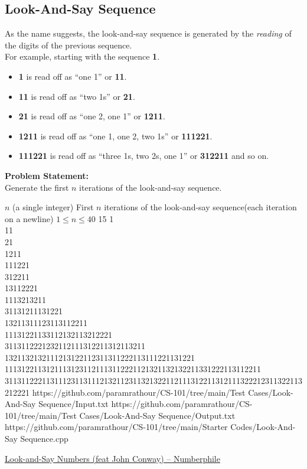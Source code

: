 \subsection{Look-And-Say Sequence}
As the name suggests, the look-and-say sequence is generated by the \emph{reading} of the digits of the previous sequence.\\%
For example, starting with the sequence \textbf{1}.
\begin{itemize}
\item \textbf{1} is read off as ``one 1'' or \textbf{11}.
\item \textbf{11} is read off as ``two 1s'' or \textbf{21}.
\item \textbf{21} is read off as ``one 2, one 1'' or \textbf{1211}.
\item \textbf{1211} is read off as ``one 1, one 2, two 1s'' or \textbf{111221}.
\item \textbf{111221} is read off as ``three 1s, two 2s, one 1'' or \textbf{312211} and so on.
\end{itemize}
\textbf{Problem Statement:}\\
Generate the first $n$ iterations of the look-and-say sequence.
\begin{testcasesMore}
	{$n$ \hfill(a single integer)}
	{First $n$ iterations of the look-and-say sequence\hfill(each iteration on a newline)}
	{$1 \leq n \leq 40$}
	{15}
	{1\\[0.5em]11\\[0.5em]21\\[0.5em]1211\\[0.5em]111221\\[0.5em]312211\\[0.5em]13112221\\[0.5em]1113213211\\[0.5em]31131211131221\\[0.5em]13211311123113112211\\[0.5em]11131221133112132113212221\\[0.5em]3113112221232112111312211312113211\\[0.5em]1321132132111213122112311311222113111221131221\\[0.5em]11131221131211131231121113112221121321132132211331222113112211\\[0.5em]311311222113111231131112132112311321322112111312211312111322212311322113212221}
	{https://github.com/paramrathour/CS-101/tree/main/Test Cases/Look-And-Say Sequence/Input.txt}
	{https://github.com/paramrathour/CS-101/tree/main/Test Cases/Look-And-Say Sequence/Output.txt}
	{https://github.com/paramrathour/CS-101/tree/main/Starter Codes/Look-And-Say Sequence.cpp}
\end{testcasesMore}
\begin{funvideo}
	\href{https://youtu.be/ea7lJkEhytA}{Look-and-Say Numbers (feat John Conway) -- Numberphile}
\end{funvideo}
\recalctypearea
